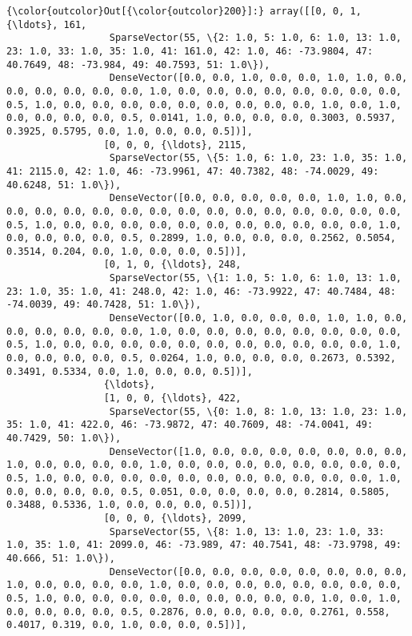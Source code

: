 \documentclass[11pt]{article}
\begin{document}
\begin{Verbatim}[commandchars=\\\{\}]
{\color{outcolor}Out[{\color{outcolor}200}]:} array([[0, 0, 1, {\ldots}, 161,
                  SparseVector(55, \{2: 1.0, 5: 1.0, 6: 1.0, 13: 1.0, 23: 1.0, 33: 1.0, 35: 1.0, 41: 161.0, 42: 1.0, 46: -73.9804, 47: 40.7649, 48: -73.984, 49: 40.7593, 51: 1.0\}),
                  DenseVector([0.0, 0.0, 1.0, 0.0, 0.0, 1.0, 1.0, 0.0, 0.0, 0.0, 0.0, 0.0, 0.0, 1.0, 0.0, 0.0, 0.0, 0.0, 0.0, 0.0, 0.0, 0.0, 0.5, 1.0, 0.0, 0.0, 0.0, 0.0, 0.0, 0.0, 0.0, 0.0, 0.0, 1.0, 0.0, 1.0, 0.0, 0.0, 0.0, 0.0, 0.5, 0.0141, 1.0, 0.0, 0.0, 0.0, 0.3003, 0.5937, 0.3925, 0.5795, 0.0, 1.0, 0.0, 0.0, 0.5])],
                 [0, 0, 0, {\ldots}, 2115,
                  SparseVector(55, \{5: 1.0, 6: 1.0, 23: 1.0, 35: 1.0, 41: 2115.0, 42: 1.0, 46: -73.9961, 47: 40.7382, 48: -74.0029, 49: 40.6248, 51: 1.0\}),
                  DenseVector([0.0, 0.0, 0.0, 0.0, 0.0, 1.0, 1.0, 0.0, 0.0, 0.0, 0.0, 0.0, 0.0, 0.0, 0.0, 0.0, 0.0, 0.0, 0.0, 0.0, 0.0, 0.0, 0.5, 1.0, 0.0, 0.0, 0.0, 0.0, 0.0, 0.0, 0.0, 0.0, 0.0, 0.0, 0.0, 1.0, 0.0, 0.0, 0.0, 0.0, 0.5, 0.2899, 1.0, 0.0, 0.0, 0.0, 0.2562, 0.5054, 0.3514, 0.204, 0.0, 1.0, 0.0, 0.0, 0.5])],
                 [0, 1, 0, {\ldots}, 248,
                  SparseVector(55, \{1: 1.0, 5: 1.0, 6: 1.0, 13: 1.0, 23: 1.0, 35: 1.0, 41: 248.0, 42: 1.0, 46: -73.9922, 47: 40.7484, 48: -74.0039, 49: 40.7428, 51: 1.0\}),
                  DenseVector([0.0, 1.0, 0.0, 0.0, 0.0, 1.0, 1.0, 0.0, 0.0, 0.0, 0.0, 0.0, 0.0, 1.0, 0.0, 0.0, 0.0, 0.0, 0.0, 0.0, 0.0, 0.0, 0.5, 1.0, 0.0, 0.0, 0.0, 0.0, 0.0, 0.0, 0.0, 0.0, 0.0, 0.0, 0.0, 1.0, 0.0, 0.0, 0.0, 0.0, 0.5, 0.0264, 1.0, 0.0, 0.0, 0.0, 0.2673, 0.5392, 0.3491, 0.5334, 0.0, 1.0, 0.0, 0.0, 0.5])],
                 {\ldots},
                 [1, 0, 0, {\ldots}, 422,
                  SparseVector(55, \{0: 1.0, 8: 1.0, 13: 1.0, 23: 1.0, 35: 1.0, 41: 422.0, 46: -73.9872, 47: 40.7609, 48: -74.0041, 49: 40.7429, 50: 1.0\}),
                  DenseVector([1.0, 0.0, 0.0, 0.0, 0.0, 0.0, 0.0, 0.0, 1.0, 0.0, 0.0, 0.0, 0.0, 1.0, 0.0, 0.0, 0.0, 0.0, 0.0, 0.0, 0.0, 0.0, 0.5, 1.0, 0.0, 0.0, 0.0, 0.0, 0.0, 0.0, 0.0, 0.0, 0.0, 0.0, 0.0, 1.0, 0.0, 0.0, 0.0, 0.0, 0.5, 0.051, 0.0, 0.0, 0.0, 0.0, 0.2814, 0.5805, 0.3488, 0.5336, 1.0, 0.0, 0.0, 0.0, 0.5])],
                 [0, 0, 0, {\ldots}, 2099,
                  SparseVector(55, \{8: 1.0, 13: 1.0, 23: 1.0, 33: 1.0, 35: 1.0, 41: 2099.0, 46: -73.989, 47: 40.7541, 48: -73.9798, 49: 40.666, 51: 1.0\}),
                  DenseVector([0.0, 0.0, 0.0, 0.0, 0.0, 0.0, 0.0, 0.0, 1.0, 0.0, 0.0, 0.0, 0.0, 1.0, 0.0, 0.0, 0.0, 0.0, 0.0, 0.0, 0.0, 0.0, 0.5, 1.0, 0.0, 0.0, 0.0, 0.0, 0.0, 0.0, 0.0, 0.0, 0.0, 1.0, 0.0, 1.0, 0.0, 0.0, 0.0, 0.0, 0.5, 0.2876, 0.0, 0.0, 0.0, 0.0, 0.2761, 0.558, 0.4017, 0.319, 0.0, 1.0, 0.0, 0.0, 0.5])],

\end{Verbatim}
\end{document}
